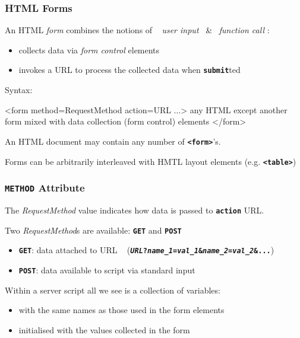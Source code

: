 \begin{frame}[fragile]
\frametitle{HTML Forms}
An HTML {\em{form}} combines the notions of
     ~ {\em{user input}} ~\&~ {\em{function call}} :
\begin{itemize}
\item  collects data via {\em{form control}} elements
\item  invokes a URL to process the collected data when \textbf{\tt{submit}}ted
\end{itemize}
Syntax:
\begin{perl}
    <form method=RequestMethod action=URL ...>
    any HTML except another form
       mixed with
    data collection (form control) elements
    </form>
\end{perl}

An HTML document may contain any number of \textbf{\tt{{\textless}form>}}'s.

Forms can be arbitrarily interleaved with HMTL layout elements
     {\small (e.g. \textbf{\tt{{\textless}table>}})}
\end{frame}

\begin{frame}
\frametitle{\textbf{\tt{METHOD}} Attribute}
The {\it{RequestMethod}} value indicates how data is passed to \textbf{\tt{action}} URL.

Two {\it{RequestMethod}}s are available: \textbf{\tt{GET}} and \textbf{\tt{POST}}
\begin{itemize}
\item 
\textbf{\tt{GET}}: data attached to URL
    ~ (\textbf{\tt{{\it{URL}}{\bf{?}}{\it{name\_{1}}}={\it{val\_{1}}}{\bf{\&}}{\it{name\_{2}}}={\it{val\_{2}}}{\bf{\&}}...}})
\item 
\textbf{\tt{POST}}: data available to script via standard input
\end{itemize}
Within a server script all we see is a collection of variables:
\begin{itemize}
\item  with the same names as those used in the form elements
\item  initialised with the values collected in the form
\end{itemize}
\end{frame}

